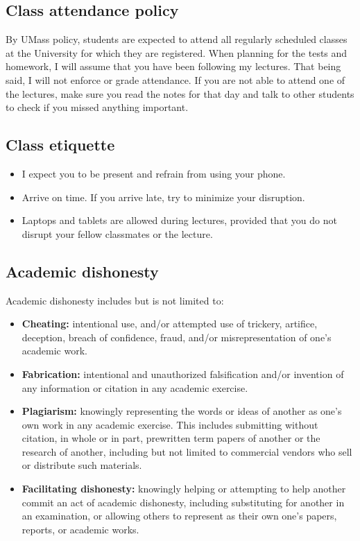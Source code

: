 \documentclass[11pt]{article}
\begin{document}
\subsection*{Class attendance policy}
\label{sec:org3da35fd}
By UMass policy, students are expected to attend all regularly scheduled
classes at the University for which they are registered. When planning for the
tests and homework, I will assume that you have been following my lectures.
That being said, I will not enforce or grade attendance. If you are not
able to attend one of the lectures, make sure you read the notes for that
day and talk to other students to check if you missed anything important.

\subsection*{Class etiquette}
\label{sec:org256f103}
\begin{itemize}
\item I expect you to be present and refrain from using your phone.
\item Arrive on time. If you arrive late, try to minimize your disruption.
\item Laptops and tablets are allowed during lectures, provided that you do not
disrupt your fellow classmates or the lecture.
\end{itemize}

\subsection*{Academic dishonesty}
\label{sec:org0df2147}

Academic dishonesty includes but is not limited to: 
\begin{itemize}
\item \textbf{Cheating:} intentional use, and/or attempted use of trickery, artifice,
deception, breach of confidence, fraud, and/or misrepresentation of one's
academic work.
\item \textbf{Fabrication:} intentional and unauthorized falsification and/or invention of
any information or citation in any academic exercise.
\item \textbf{Plagiarism:} knowingly representing the words or ideas of another as one's
own work in any academic exercise. This includes submitting without citation,
in whole or in part, prewritten term papers of another or the research of
another, including but not limited to commercial vendors who sell or
distribute such materials.
\item \textbf{Facilitating dishonesty:} knowingly helping or attempting to help another
commit an act of academic dishonesty, including substituting for another in
an examination, or allowing others to represent as their own one's papers,
reports, or academic works.
\end{itemize}
\end{document}
